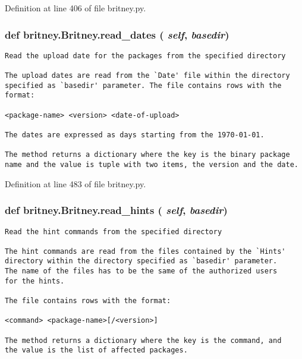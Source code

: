 Definition at line 406 of file britney.py.
\subsubsection{\setlength{\rightskip}{0pt plus 5cm}def britney.Britney.read\_\-dates ( {\em self},  {\em basedir})}\label{classbritney_1_1Britney_085af5ac906813ea40fc2e623748f517}




\footnotesize\begin{verbatim}Read the upload date for the packages from the specified directory

The upload dates are read from the `Date' file within the directory
specified as `basedir' parameter. The file contains rows with the
format:

<package-name> <version> <date-of-upload>

The dates are expressed as days starting from the 1970-01-01.

The method returns a dictionary where the key is the binary package
name and the value is tuple with two items, the version and the date.
\end{verbatim}
\normalsize
 

Definition at line 483 of file britney.py.
\subsubsection{\setlength{\rightskip}{0pt plus 5cm}def britney.Britney.read\_\-hints ( {\em self},  {\em basedir})}\label{classbritney_1_1Britney_46d535f617fcf1faaaf5d841ea23c184}




\footnotesize\begin{verbatim}Read the hint commands from the specified directory

The hint commands are read from the files contained by the `Hints'
directory within the directory specified as `basedir' parameter. 
The name of the files has to be the same of the authorized users
for the hints.

The file contains rows with the format:

<command> <package-name>[/<version>]

The method returns a dictionary where the key is the command, and
the value is the list of affected packages.
\end{verbatim}
\normalsize
 


